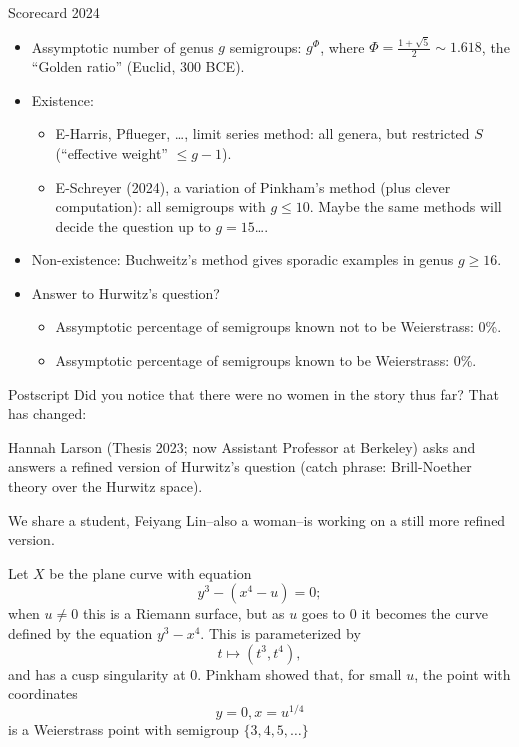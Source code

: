\documentclass[12pt, aspectratio=169]{beamer}
\begin{document}
\begin{frame}{Scorecard 2024}\
\begin{itemize}
\item<1-> Assymptotic number of genus $g$ semigroups: $g^\Phi$, where $\Phi = \frac{1+\sqrt 5}{2}\sim 1.618$, the ``Golden ratio'' (Euclid, 300 BCE).
 \item<2-> Existence: 
\begin{itemize}
  \item<3-> E-Harris, Pflueger, \dots, limit series method: all genera, but restricted $S$ (``effective weight'' $\leq g-1$).
\item<3-> E-Schreyer (2024), a variation of Pinkham's method (plus clever computation): all semigroups with $g\leq 10$. Maybe the same methods will decide the question up to $g =15$\dots .
\end{itemize}
\item<4-> Non-existence: Buchweitz's method gives sporadic examples in genus $g \geq 16$.
\item<5-> Answer to Hurwitz's question?
\begin{itemize}
  \item<6-> \alert{Assymptotic percentage of semigroups  known not to be Weierstrass: 0\%.}
 \item<6-> \alert{Assymptotic percentage of semigroups  known to be Weierstrass: 0\%.}
\end{itemize}
 \end{itemize}
\end{frame}

\begin{frame}{Postscript} 
Did you notice that there were no women in the story thus far? That has changed: 
\bigskip

 \alert{Hannah Larson} (Thesis 2023; now Assistant Professor at Berkeley) asks and answers a refined version of Hurwitz's question (catch phrase: Brill-Noether theory over the Hurwitz space). 
 \bigskip
 
We share a student, \alert{Feiyang Lin}--also a woman--is working on a still more refined version.
 
\end{frame}

\begin{frame}

\begin{example}[Pinkham, 1974]
Let $X$ be the plane curve with equation $$y^3-(x^4 -u) = 0;$$ when $u\neq 0$ this is a Riemann surface, but as $u$ goes to 0 it becomes the curve 
defined by the equation $y^3-x^4$. This is parameterized by $$t\mapsto (t^3, t^4),$$ and has a cusp singularity at 0. Pinkham showed that, for small $u$, the
point with coordinates $$y=0, x=u^{1/4}$$ is a Weierstrass point with 
semigroup $\{3,4,5,\dots\}$
\end{example}
\end{frame}
\end{document}
